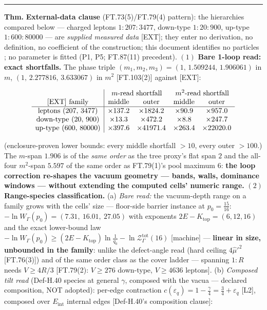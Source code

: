 \begin{theorem}
\vspace{2pt}\noindent\rule{\textwidth}{0.4pt}\vspace{2pt}

\end{theorem}

\begin{theorem}\label{tag:FT-104}
\textbf{Thm.} \textbf{External-data clause} (FT.73(5)/FT.79(4) pattern): the hierarchies compared below — charged leptons $1{:}207{:}3477$, down-type $1{:}20{:}900$, up-type $1{:}600{:}80000$ — are \textit{supplied measured data} [EXT]; they enter no derivation, no definition, no coefficient of the construction; this document identifies no particles ; no parameter is fitted (P1, P5; FT.87(11) precedent). $(1)$ \textbf{Bare 1-loop read: exact shortfalls.} The phase triple $(m_1,m_2,m_3)=(1,\,1.509244,\,1.906061)$ in $m$, $(1,\,2.277816,\,3.633067)$ in $m^2$ [FT.103(2)] against [EXT]:

\[
\begin{array}{c|cccc}
&\multicolumn2c{m\text{-read shortfall}}&\multicolumn2c{m^2\text{-read shortfall}}\\
\text{[EXT] family}&\text{middle}&\text{outer}&\text{middle}&\text{outer}\\ \hline
\text{leptons }(207,\,3477)&\times137.2&\times1824.2&\times90.9&\times957.0\\
\text{down-type }(20,\,900)&\times13.3&\times472.2&\times8.8&\times247.7\\
\text{up-type }(600,\,80000)&\times397.6&\times41971.4&\times263.4&\times22020.0
\end{array}
\]

(enclosure-proven lower bounds: every middle shortfall $>10$, every outer $>100$.) The $m$-span $1.906$ is of the \textit{same order} as the tree proxy's flat span $2$ and the all-four $m^2$-span $5.597$ of the same order as FT.79(1)'s pool maximum $6$: \textbf{the loop correction re-shapes the vacuum geometry — bands, walls, dominance windows — without extending the computed cells' numeric range.} $(2)$ \textbf{Range-species classification.} (a) \textit{Bare read:} the vacuum-depth range on a family grows with the cells' size — floor-side barrier instance at $p_0=\tfrac{15}{16}$: $-\ln W_\Gamma(p_0)=(7.31,\ 16.01,\ 27.05)$ with exponents $2E-K_{\mathrm{top}}=(6,12,16)$ and the exact lower-bound law $-\ln W_\Gamma(p_0)\ge(2E-K_{\mathrm{top}})\ln\tfrac1{q_0}-\ln\mathcal Z^{\mathrm{tot}}_\Gamma(16)$ [machine] — \textbf{linear in size, unbounded in the family}: unlike the defect-angle read (hard ceiling $4\hat\mu'^2$ [FT.76(3)]) and of the same order class as the cover ladder — spanning $1{:}R$ needs $V\ge4R/3$ [FT.79(2): $V\ge276$ down-type, $V\ge4636$ leptons]. (b) \textit{Composed tilt read} (Def-H.40 species at general $\gamma$, composed with the vacua — declared composition, NOT adopted): per-edge contraction $c(\varepsilon_q)=1-\tfrac\gamma4=\tfrac34+\varepsilon_q$ [L2], composed over $E_{\mathrm{int}}$ internal edges [Def-H.40's composition clause]:


\end{theorem}
